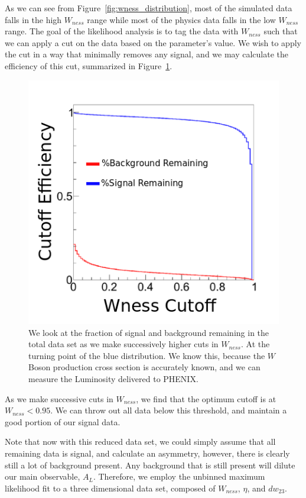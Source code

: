 As we can see from Figure~\ref{fig:wness_distribution}, most of the simulated
data falls in the high $W_{ness}$ range while most of the physics data falls in
the low $W_{ness}$ range. The goal of the likelihood analysis is to tag the data
with $W_{ness}$ such that we can apply a cut on the data based on the
parameter's value. We wish to apply the cut in a way that minimally removes any
signal, and we may calculate the efficiency of this cut, summarized in
Figure~\ref{fig:wness_cut_efficiency}.

\begin{figure}
  \centering
  \includegraphics[width=0.7\linewidth]{./figures/wness_cut_efficiency.png}
  \caption{
    We look at the fraction of signal and background remaining in the total data
    set as we make successively higher cuts in $W_{ness}$. At the turning point
    of the blue distribution. We know this, because the $W$ Boson production
    cross section is accurately known, and we can measure the Luminosity
    delivered to PHENIX. 
  }
  \label{fig:wness_cut_efficiency}
\end{figure}

As we make successive cuts in $W_{ness}$, we find that the optimum cutoff is at
$W_{ness} < 0.95$. We can throw out all data below this threshold, and
maintain a good portion of our signal data.

Note that now with this reduced data set, we could simply assume that all
remaining data is signal, and calculate an asymmetry, however, there is clearly
still a lot of background present. Any background that is still present will
dilute our main observable, $A_L$. Therefore, we employ the unbinned maximum
likelihood fit to a three dimensional data set, composed of $W_{ness}$, $\eta$,
and $dw_{23}$.

